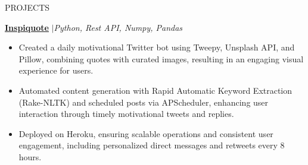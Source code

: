 \documentclass{resume} %
\begin{document}
\begin{rSection}{PROJECTS}


\href{https://github.com/RutvikJ77/Inspiquote}{\textbf{\underline{Inspiquote}}} $|$\textit{Python, Rest API, Numpy, Pandas}
\begin{itemize}
  \item Created a daily motivational Twitter bot using Tweepy, Unsplash API, and Pillow, combining quotes with curated images, resulting in an engaging visual experience for users.
  \item Automated content generation with Rapid Automatic Keyword Extraction (Rake-NLTK) and scheduled posts via APScheduler, enhancing user interaction through timely motivational tweets and replies.
  \item Deployed on Heroku, ensuring scalable operations and consistent user engagement, including personalized direct messages and retweets every 8 hours.
\end{itemize}


\end{rSection}
\end{document}
